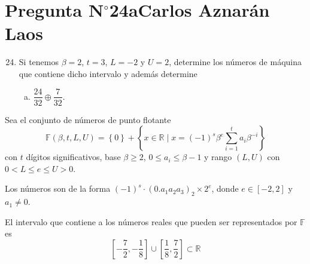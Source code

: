 \section{Pregunta N$^{\circ}$24a\qquad Carlos Aznarán Laos}

\begin{frame}
	\begin{enumerate}\setcounter{enumi}{23}
		\item

		      Si tenemos $\beta=2$, $t=3$, $L=-2$ y $U=2$, determine los
		      números de máquina que contiene dicho intervalo y además
		      determine

		      \begin{enumerate}[b)]
			      \item

			            \begin{math}
				            \dfrac{24}{32}\oplus
				            \dfrac{7}{32}
			            \end{math}.
		      \end{enumerate}
	\end{enumerate}

	\begin{solution}
		\begin{definition}
			Sea el \alert{conjunto de números de punto flotante}
			\begin{equation*}
				\mathbb{F}\left(\beta,t,L,U\right)=
				\left\{0\right\}+
				\left\{
				x\in\mathbb{R}\mid
				x=
				\left(-1\right)^{s}
				\beta^{e}
				\sum_{i=1}^{t}a_{i}\beta^{-i}
				\right\}
			\end{equation*}
			con $t$ dígitos significativos, base $\beta\geq2$,
			$0\leq a_{i}\leq\beta-1$ y rango $\left(L,U\right)$ con
			$0<L\leq e\leq U>0$.
		\end{definition}

		Los números son de la forma
		\begin{math}
			\left(-1\right)^{s}\cdot
			\left(0.a_{1}a_{2}a_{3}\right)_{2}\times
			2^{e}
		\end{math},
		donde $e\in\left[-2,2\right]$ y $a_{1}\neq0$.

		El intervalo que contiene a los números reales que pueden ser
		representados por $\mathbb{F}$ es
		\begin{equation*}
			\left[-\dfrac{7}{2},-\dfrac{1}{8}\right]\cup
			\left[\dfrac{1}{8},\dfrac{7}{2}\right]\subset\mathbb{R}
		\end{equation*}
	\end{solution}
\end{frame}

